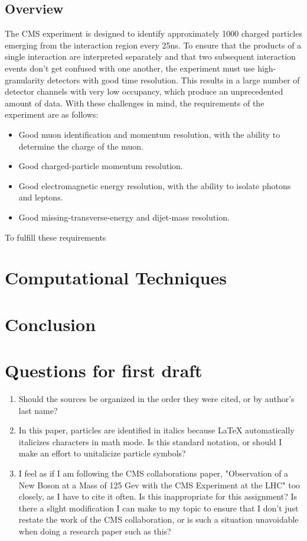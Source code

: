 \documentclass[12pt]{article}
\begin{document}
\subsection{Overview}
The CMS experiment is designed to identify approximately 1000 charged particles emerging from the interaction region every 25ns. To ensure that the products of a single interaction are interpreted separately and that two subsequent interaction events don't get confused with one another, the experiment must use high-granularity detectors with good time resolution. This results in a large number of detector channels with very low occupancy, which produce an unprecedented amount of data. With these challenges in mind, the requirements of the experiment are as follows:
\begin{itemize}
\item Good muon identification and momentum resolution, with the ability to determine the charge of the muon.
\item Good charged-particle momentum resolution.
\item Good electromagnetic energy resolution, with the ability to isolate photons and leptons.
\item Good missing-transverse-energy and dijet-mass resolution.
\end{itemize}
\noindent
To fulfill these requirements


\section{Computational Techniques}
\label{comp_tech}
\section{Conclusion}






\section{Questions for first draft}
\begin{enumerate}
\item Should the sources be organized in the order they were cited, or by author's last name?
\item In this paper, particles are identified in italics because \LaTeX \; automatically italicizes characters in math mode. Is this standard notation, or should I make an effort to unitalicize particle symbols?
\item I feel as if I am following the CMS collaborations paper, "Observation of a New Boson at a Mass of 125 Gev with the CMS Experiment at the LHC" too closely, as I have to cite it often. Is this inappropriate for this assignment? Is there a slight modification I can make to my topic to ensure that I don't just restate the work of the CMS collaboration, or is such a situation unavoidable when doing a research paper such as this?
 
\end{enumerate}
\end{document}
